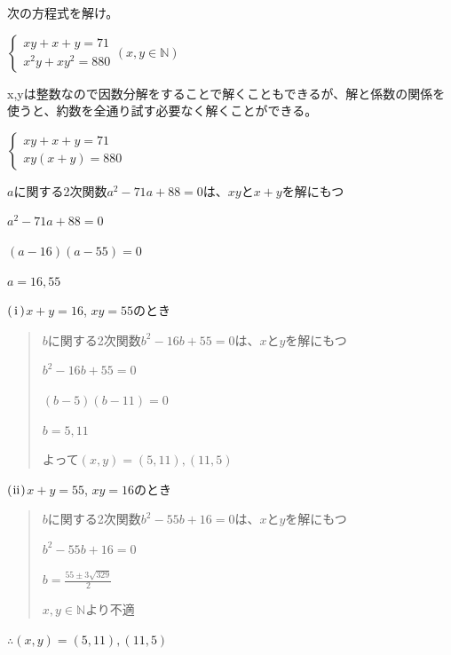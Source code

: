 \documentclass[uplatex,dvipdfmx]{jsbook}
\begin{document}
\begin{problem}[練習問題2]
    次の方程式を解け。

    \begin{math}
        \begin{cases}
            xy+x+y=71\\
            x^2y+xy^2=880
        \end{cases}
        \left(x,y\in\mathbb{N}\right)
    \end{math}
\end{problem}

\begin{answer}
    x,yは整数なので因数分解をすることで解くこともできるが、解と係数の関係を使うと、約数を全通り試す必要なく解くことができる。

    \begin{math}
        \begin{cases}
            xy+x+y=71\\
            xy\left(x+y\right)=880
        \end{cases}
    \end{math}

    $a$に関する2次関数$a^2-71a+88=0$は、$xy$と$x+y$を解にもつ

    $a^2-71a+88=0$

    $\left(a-16\right)\left(a-55\right)=0$

    $a=16,55$

    $\rm\left(\hspace{.18em}i\hspace{.18em}\right)$$x+y=16$, $xy=55$のとき

    \begin{quote}
        $b$に関する2次関数$b^2-16b+55=0$は、$x$と$y$を解にもつ

        $b^2-16b+55=0$

        $\left(b-5\right)\left(b-11\right)=0$

        $b=5,11$

        よって$\left(x,y\right)=\left(5,11\right),\left(11,5\right)$
    \end{quote}

    $\rm\left(\hspace{.08em}ii\hspace{.08em}\right)$$x+y=55$, $xy=16$のとき
    \begin{quote}
        $b$に関する2次関数$b^2-55b+16=0$は、$x$と$y$を解にもつ

        $b^2-55b+16=0$

        $\displaystyle b=\frac{55\pm 3 \sqrt{329}}{2}$

        $x,y\in\mathbb{N}$より不適
    \end{quote}

    $\therefore \left(x,y\right)=\left(5,11\right),\left(11,5\right)$
\end{answer}
\end{document}
